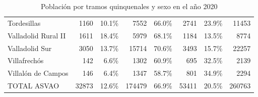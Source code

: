 \begin{table}[H]
\begin{tabular}{lrrrrrrr}
        Tordesillas              & 1160          & 10.1\%           & 7552           & 66.0\%           & 2741          & 23.9\%           & 11453          \\
        Valladolid Rural II      & 1611          & 18.4\%           & 5979           & 68.1\%           & 1184          & 13.5\%           & 8774           \\
        Valladolid Sur           & 3050          & 13.7\%           & 15714          & 70.6\%           & 3493          & 15.7\%           & 22257          \\
        Villafrechós             & 142           & 6.6\%            & 1302           & 60.9\%           & 695           & 32.5\%           & 2139           \\
        Villalón de Campos       & 146           & 6.4\%            & 1347           & 58.7\%           & 801           & 34.9\%           & 2294           \\
        \midrule
        TOTAL ASVAO              & 32873         & 12.6\%           & 174479         & 66.9\%           & 53411         & 20.5\%           & 260763         \\
        \bottomrule
    \end{tabular}
    \caption{Población por tramos quinquenales y sexo en el año 2020}
    \label{tab:poblacion}
\end{table}




